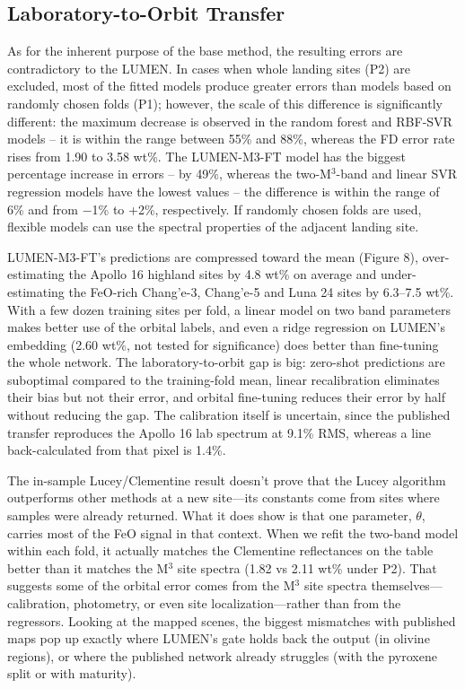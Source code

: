\documentclass[remotesensing,article,submit,pdftex,moreauthors]{Definitions/mdpi}
\begin{document}
\subsection{Laboratory-to-Orbit Transfer}

As for the inherent purpose of the base method, the resulting errors are contradictory to the LUMEN. In cases when whole landing sites (P2) are excluded, most of the fitted models produce greater errors than models based on randomly chosen folds (P1); however, the scale of this difference is significantly different: the maximum decrease is observed in the random forest and RBF-SVR models -- it is within the range between 55\% and 88\%, whereas the FD error rate rises from 1.90 to 3.58 wt\%. The LUMEN-M3-FT model has the biggest percentage increase in errors -- by 49\%, whereas the two-M$^{3}$-band and linear SVR regression models have the lowest values -- the difference is within the range of 6\% and from $-$1\% to +2\%, respectively. If randomly chosen folds are used, flexible models can use the spectral properties of the adjacent landing site.

LUMEN-M3-FT's predictions are compressed toward the mean (Figure 8), over-estimating the Apollo 16 highland sites by 4.8 wt\% on average and under-estimating the FeO-rich Chang'e-3, Chang'e-5 and Luna 24 sites by 6.3--7.5 wt\%. With a few dozen training sites per fold, a linear model on two band parameters makes better use of the orbital labels, and even a ridge regression on LUMEN's embedding (2.60 wt\%, not tested for significance) does better than fine-tuning the whole network. The laboratory-to-orbit gap is big: zero-shot predictions are suboptimal compared to the training-fold mean, linear recalibration eliminates their bias but not their error, and orbital fine-tuning reduces their error by half without reducing the gap. The calibration itself is uncertain, since the published transfer reproduces the Apollo 16 lab spectrum at 9.1\% RMS, whereas a line back-calculated from that pixel is 1.4\%.

The in-sample Lucey/Clementine result doesn't prove that the Lucey algorithm outperforms other methods at a new site---its constants come from sites where samples were already returned. What it does show is that one parameter, $\theta$, carries most of the FeO signal in that context. When we refit the two-band model within each fold, it actually matches the Clementine reflectances on the table better than it matches the M$^{3}$ site spectra (1.82 vs 2.11 wt\% under P2). That suggests some of the orbital error comes from the M$^{3}$ site spectra themselves---calibration, photometry, or even site localization---rather than from the regressors. Looking at the mapped scenes, the biggest mismatches with published maps pop up exactly where LUMEN's gate holds back the output (in olivine regions), or where the published network already struggles (with the pyroxene split or with maturity).
\end{document}
